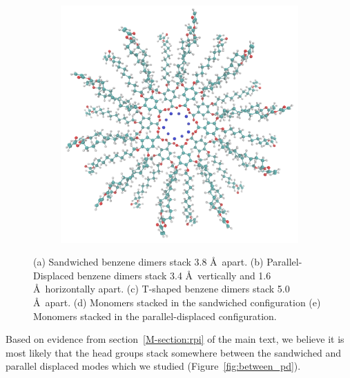 \documentclass{article}
\newcommand{\angstrom}{\textup{\AA}}
\begin{document}
\begin{figure}[!htb]
\begin{subfigure}[b]{0.475\textwidth}
                \caption{}\label{fig:sandwichedlayers}
        \end{subfigure}
        \begin{subfigure}[b]{0.475\textwidth}
                \centering
                \includegraphics[width=\textwidth]{offsetlayers.png}
                \caption{}\label{fig:offsetlayers}
        \end{subfigure}
        \caption{(a) Sandwiched benzene dimers stack 3.8 \angstrom~apart. (b) Parallel-Displaced benzene dimers stack
        3.4 \angstrom~vertically and 1.6 \angstrom~horizontally apart. (c) T-shaped benzene dimers stack 5.0 \angstrom~apart.
        (d) Monomers stacked in the sandwiched configuration (e) Monomers stacked in the parallel-displaced
        configuration.}\label{fig:stacking}
  \end{figure}

  Based on evidence from section~\ref{M-section:rpi} of the main text, we
  believe it is most likely that the head groups stack somewhere between
  the sandwiched and parallel displaced modes which we studied (Figure~\ref{fig:between_pd}).
\end{document}

